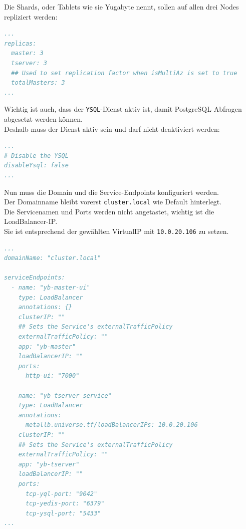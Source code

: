 \begin{flushleft}
    Die Shards, oder Tablets wie sie Yugabyte nennt, sollen auf allen drei Nodes repliziert werden:
    \lstset{style=gra_codestyle}
    \begin{lstlisting}[language=yaml, caption=yugabyteDB - Helm Chart Manifest - Detail Replika,captionpos=b,label={lst:yugabytedb-replica-setting},breaklines=true]
...
replicas:
  master: 3
  tserver: 3
  ## Used to set replication factor when isMultiAz is set to true
  totalMasters: 3
...
    \end{lstlisting}

    Wichtig ist auch, dass der \texttt{YSQL}-Dienst aktiv ist, damit PostgreSQL Abfragen abgesetzt werden können.\\
    Deshalb muss der Dienst aktiv sein und darf nicht deaktiviert werden:
    \lstset{style=gra_codestyle}
    \begin{lstlisting}[language=yaml, caption=yugabyteDB - Helm Chart Manifest - Detail Disable YSQL,captionpos=b,label={lst:yugabytedb-disableYsql-setting},breaklines=true]
...
# Disable the YSQL
disableYsql: false
...
    \end{lstlisting}

    Nun muss die Domain und die Service-Endpoints konfiguriert werden.\\
    Der Domainname bleibt vorerst \texttt{cluster.local} wie Default hinterlegt.\\
    Die Servicenamen und Ports werden nicht angetastet, wichtig ist die LoadBalancer-IP.\\
    Sie ist entsprechend der gewählten VirtualIP mit \texttt{10.0.20.106} zu setzen.

    \lstset{style=gra_codestyle}
    \begin{lstlisting}[language=yaml, caption=yugabyteDB - Helm Chart Manifest - Detail Domainname und Service-Endpoints,captionpos=b,label={lst:yugabytedb-domainname-serviceendpoints-setting},breaklines=true]
...
domainName: "cluster.local"

serviceEndpoints:
  - name: "yb-master-ui"
    type: LoadBalancer
    annotations: {}
    clusterIP: ""
    ## Sets the Service's externalTrafficPolicy
    externalTrafficPolicy: ""
    app: "yb-master"
    loadBalancerIP: ""
    ports:
      http-ui: "7000"

  - name: "yb-tserver-service"
    type: LoadBalancer
    annotations:
      metallb.universe.tf/loadBalancerIPs: 10.0.20.106
    clusterIP: ""
    ## Sets the Service's externalTrafficPolicy
    externalTrafficPolicy: ""
    app: "yb-tserver"
    loadBalancerIP: ""
    ports:
      tcp-yql-port: "9042"
      tcp-yedis-port: "6379"
      tcp-ysql-port: "5433"
...
    \end{lstlisting}
\end{flushleft}
